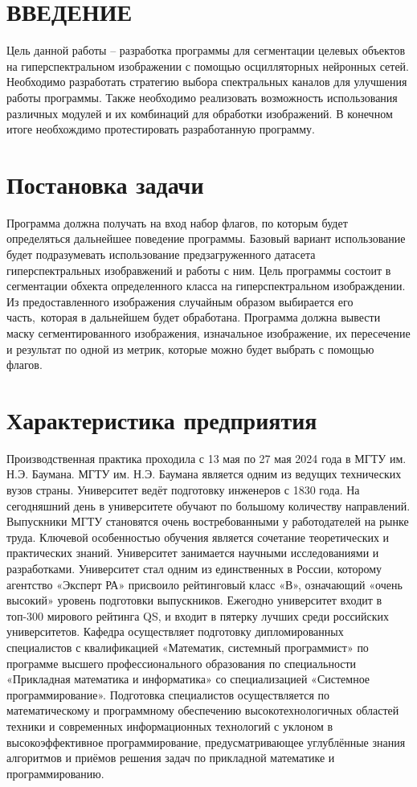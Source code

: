 \documentclass[14pt, russian]{scrartcl}
\newcommand{\anonsection}[1]{\cleardoublepage
\phantomsection
\addcontentsline{toc}{section}{\protect\numberline{}#1}
\section*{#1}\vspace*{2.5ex} %
}
\begin{document}
\newpage
\renewcommand\contentsname{\hfill{\normalfont{СОДЕРЖАНИЕ}}\hfill}  %
\tableofcontents
\newpage
\anonsection{ВВЕДЕНИЕ}  %

Цель данной работы -- разработка программы для сегментации целевых объектов на гиперспектральном изображении с помощью осцилляторных нейронных сетей. 
Необходимо разработать стратегию выбора спектральных каналов для улучшения работы программы. Также необходимо реализовать возможность использования различных модулей
и их комбинаций для обработки изображений. В конечном итоге необхождимо протестировать разработанную программу.
\newpage

\section{Постановка задачи}\label{sect:task_set}

Программа должна получать на вход набор флагов, по которым будет определяться дальнейшее поведение программы. Базовый вариант использование будет подразумевать
использование предзагруженного датасета гиперспектральных изобравжений и работы с ним. Цель программы состоит в сегментации обхекта определенного класса на 
гиперспектральном изображдении. Из предоставленного изображения случайным образом выбирается его часть,\
которая в дальнейшем будет обработана. Программа должна вывести маску сегментированного изображения, изначальное изображение, их пересечение и результат по 
одной из метрик, которые можно будет выбрать с помощью флагов. 

\section{Характеристика предприятия}

Производственная практика проходила с 13 мая по 27 мая 2024 года в МГТУ
им. Н.Э. Баумана.
МГТУ им. Н.Э. Баумана является одним из ведущих технических вузов
страны. Университет ведёт подготовку инженеров с 1830 года. На сегодняшний
день в университете обучают по большому количеству направлений. Выпускники
МГТУ становятся очень востребованными у работодателей на рынке труда. Ключевой особенностью обучения является сочетание теоретических и практических
знаний. Университет занимается научными исследованиями и разработками. Университет стал одним из единственных в России, которому агентство «Эксперт РА»
присвоило рейтинговый класс «В», означающий «очень высокий» уровень подготовки выпускников. Ежегодно университет входит в топ-300 мирового рейтинга
QS, и входит в пятерку лучших среди российских университетов.
Кафедра осуществляет подготовку дипломированных специалистов с квалификацией «Математик, системный программист» по программе высшего профессионального образования по специальности «Прикладная математика и информатика» со специализацией «Системное программирование».
Подготовка специалистов осуществляется по математическому и программному обеспечению высокотехнологичных областей техники и современных информационных технологий с уклоном в высокоэффективное программирование,
предусматривающее углублённые знания алгоритмов и приёмов решения задач по
прикладной математике и программированию.
\end{document}

